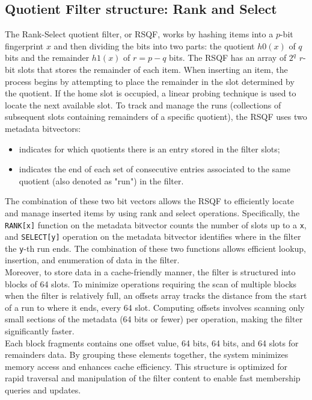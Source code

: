 \subsection{Quotient Filter structure: Rank and Select}
The Rank-Select quotient filter, or \gls{RSQF}, works by hashing items into a $p$-bit fingerprint $x$ and then dividing the bits into two parts: the quotient $h0(x)$ of $q$ bits and the remainder $h1(x)$ of $r = p - q$ bits. The RSQF has an array of $2^q$ $r$-bit slots that stores the remainder of each item. When inserting an item, the process begins by attempting to place the remainder in the slot determined by the quotient. If the home slot is occupied, a linear probing technique is used to locate the next available slot.
To track and manage the runs (collections of subsequent slots containing remainders of a specific quotient), the RSQF uses two metadata bitvectors:
\begin{itemize}
	\item[\occs] indicates for which quotients there is an entry stored in the filter slots;
	\item[\rends] indicates the end of each set of consecutive entries associated to the same quotient (also denoted as "run") in the filter.
\end{itemize}
The combination of these two bit vectors allows the RSQF to efficiently locate and manage inserted items by using rank and select operations. Specifically, the \texttt{RANK[x]} function on the \occ metadata bitvector counts the number of \occ slots up to a \texttt{x}, and \texttt{SELECT[y]} operation on the \rends metadata bitvector identifies where in the filter the \texttt{y}-th run ends. The combination of these two functions allows efficient lookup, insertion, and enumeration of data in the filter.\\
Moreover, to store data in a cache-friendly manner, the filter is structured into blocks of 64 slots. To minimize operations requiring the scan of multiple blocks when the filter is relatively full, an offsets array tracks the distance from the start of a run to where it ends, every 64 slot. Computing offsets involves scanning only small sections of the metadata (64 bits or fewer) per operation, making the filter significantly faster.\\
Each block fragments contains one offset value, 64 \occs bits, 64 \rends bits, and 64 slots for remainders data. By grouping these elements together, the system minimizes memory access and enhances cache efficiency. This structure is optimized for rapid traversal and manipulation of the filter content to enable fast membership queries and updates.\\
